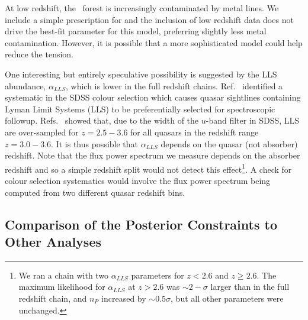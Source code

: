 At low redshift, the \Lya~forest is increasingly contaminated by metal lines.
We include a simple prescription for  and the inclusion of low redshift data does not drive the best-fit parameter for this model, preferring slightly less metal contamination.
However, it is possible that a more sophisticated model could help reduce the tension.

One interesting but entirely speculative possibility is suggested by the LLS abundance, $\alpha_{LLS}$, which is lower in the full redshift chains.
Ref.~\cite{Prochaska:2009a} identified a systematic in the SDSS colour selection which causes quasar sightlines containing Lyman Limit Systems (LLS) to be preferentially selected for spectroscopic followup.
Refs.~\cite{Worseck:2011, Fumagalli:2013} showed that, due to the width of the $u$-band filter in SDSS, LLS are over-sampled for $z=2.5-3.6$ for all quasars in the redshift range $z=3.0-3.6$.
It is thus possible that $\alpha_{LLS}$ depends on the quasar (not absorber) redshift.
Note that the flux power spectrum we measure depends on the absorber redshift and so a simple redshift split would not detect this effect\footnote{We ran a chain with two $\alpha_{LLS}$ parameters for $z < 2.6$ and $z \geq 2.6$. The maximum likelihood for $\alpha_{LLS}$ at $z > 2.6$ was $\sim 2-\sigma$ larger than in the full redshift chain, and $n_P$ increased by $\sim 0.5\sigma$, but all other parameters were unchanged.}.
A check for colour selection systematics would involve the flux power spectrum being computed from two different quasar redshift bins.

\subsection[Comparison of the Posterior Constraints to Other Lyman-alpha Analyses]{Comparison of the Posterior Constraints to Other \Lya Analyses}
\label{sec:comparison}



